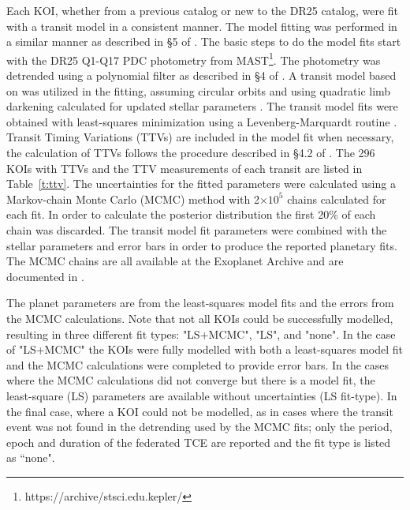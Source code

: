 \label{s:mcmc}

Each KOI, whether from a previous catalog or new to the DR25 catalog, were fit with a transit model in a consistent manner. The model fitting was performed in a similar manner as described in \S5 of \citet{Rowe2015cat}. The basic steps to do the model fits start with the DR25 Q1-Q17 PDC photometry from MAST\footnote{https://archive/stsci.edu.kepler/}. The photometry was detrended using a polynomial filter as described in \S4 of \citet{Rowe2014}. A transit model based on \citet{Mandel2002} was utilized in the fitting, assuming circular orbits and using quadratic limb darkening \citep{Claret2011} calculated for updated stellar parameters \citep{Mathur2017ApJS}. The transit model fits were obtained with least-squares minimization using a Levenberg-Marquardt routine \citep{More1980}. Transit Timing Variations (TTVs) are included in the model fit when necessary, the calculation of TTVs follows the procedure described in \S4.2 of \citet{Rowe2014}. The 296 KOIs with TTVs and the TTV measurements of each transit are listed in Table~\ref{t:ttv}. The uncertainties for the fitted parameters were calculated using a Markov-chain Monte Carlo (MCMC) method \citep{Ford2005AJ} with 2$\times 10^{5}$ chains calculated for each fit. In order to calculate the posterior distribution the first 20\% of each chain was discarded. The transit model fit parameters were combined with the stellar parameters and error bars \citep{Mathur2017ApJS} in order to produce the reported planetary fits. The MCMC chains are all available at the Exoplanet Archive and are documented in \citet{Hoffman2017}. 

The planet parameters are from the least-squares model fits and the errors from the MCMC calculations. Note that not all KOIs could be successfully modelled, resulting in three different fit types: "LS+MCMC", "LS", and "none". In the case of "LS+MCMC" the KOIs were fully modelled with both a least-squares model fit and the MCMC calculations were completed to provide error bars. In the cases where the MCMC calculations did not converge but there is a model fit, the least-square (LS) parameters are available without uncertainties (LS fit-type). In the final case, where a KOI could not be modelled, as in cases where the transit event was not found in the detrending used by the MCMC fits; only the period, epoch and duration of the federated TCE are reported and the fit type is listed as ``none".

